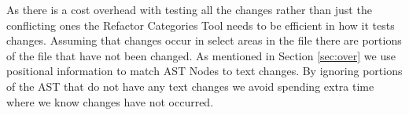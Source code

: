 As there is a cost overhead with testing all the changes rather than just the conflicting ones the Refactor Categories Tool needs to be efficient in how it tests changes.  Assuming that changes occur in select areas in the file there are portions of the file that have not been changed.  
As mentioned in Section \ref{sec:over} we use positional information to match AST Nodes to text changes.  By ignoring portions of the AST that do not have any text changes we avoid spending extra time where we know changes have not occurred.

% 

% 
% 


